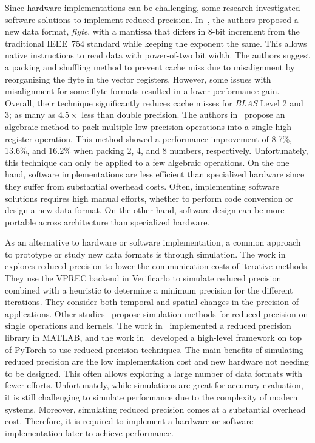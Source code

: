 Since hardware implementations can be challenging, some research investigated
software solutions to implement reduced precision.
In~\cite{Anderson2016-yn}, the authors proposed a new data format, \textit{flyte},
with a mantissa that differs in 8-bit increment from the traditional IEEE~754
standard while keeping the exponent the same.
This allows native instructions to read data with power-of-two bit width.
The authors suggest a packing and shuffling method to prevent cache miss due to misalignment by reorganizing the flyte in the vector registers.
However, some issues with misalignment for some flyte formats resulted in a lower performance gain.
Overall, their technique significantly reduces cache misses for \textit{BLAS} Level 2 and 3; as many as $4.5\times$ less than double precision.
The authors in~\cite{Zucker1994-rg} propose an algebraic method to pack multiple
low-precision operations into a single high-register operation.
This method showed a performance improvement of 8.7\%, 13.6\%, and 16.2\% when packing
2, 4, and 8 numbers, respectively.
Unfortunately, this technique can only be applied to a few algebraic operations.
On the one hand, software implementations are less efficient than specialized hardware
since they suffer from substantial overhead costs.
Often, implementing software solutions requires high manual efforts, whether to
perform code conversion or design a new data format.
On the other hand, software design can be more portable across architecture than specialized hardware.

As an alternative to hardware or software implementation, a common approach to
prototype or study new data formats is through simulation.
The work in~\cite{Chatelain2019-fu} explores reduced precision to lower the communication costs of iterative methods.
They use the VPREC backend in Verificarlo to simulate reduced precision combined
with a heuristic to determine a minimum precision for the different iterations.
They consider both temporal and spatial changes in the precision of applications.
Other studies~\cite{Higham2019-yd,Zhang2019-xv} propose simulation methods for reduced
precision on single operations and kernels.
The work in~\cite{Higham2019-yd} implemented a reduced precision library in MATLAB, and
the work in~\cite{Zhang2019-xv} developed a high-level framework on top of PyTorch to use
reduced precision techniques.
The main benefits of simulating reduced precision are the low implementation cost and new hardware not needing to be designed.
This often allows exploring a large number of data formats with fewer efforts.
Unfortunately, while simulations are great for accuracy evaluation, it is still challenging to simulate performance due to the complexity of modern systems.
Moreover, simulating reduced precision comes at a substantial overhead cost.
Therefore, it is required to implement a hardware or software implementation later to achieve performance.


